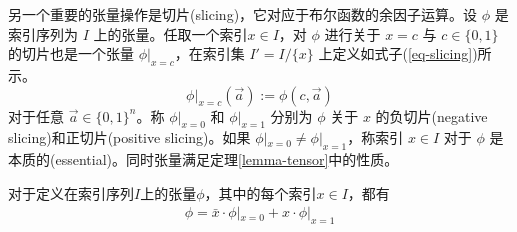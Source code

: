 另一个重要的张量操作是切片(slicing)，它对应于布尔函数的余因子运算。设 $\phi$ 是索引序列为 $I$ 上的张量。任取一个索引\(x\in I\)，对 $\phi$ 进行关于 $x = c$ 与 $c \in \{0, 1\}$ 的切片也是一个张量 $\phi|_{x=c}$，在索引集 $I' =I/\{x\}$ 上定义如式子(\ref{eq-slicing})所示。
\begin{equation}
    \label{eq-slicing}
\phi|_{x=c}(\overrightarrow{a}) := \phi(c, \overrightarrow{a})
\end{equation}
对于任意 $\overrightarrow{a} \in \{0, 1\}^n$。称 $\phi|_{x=0}$ 和 $\phi|_{x=1}$ 分别为 $\phi$ 关于 $x$ 的负切片(negative slicing)和正切片(positive slicing)。如果 $\phi|_{x=0} \neq \phi|_{x=1}$，称索引 $x \in I$ 对于 $\phi$ 是本质的(essential)。同时张量满足定理\ref{lemma-tensor}中的性质。

\begin{lemma}
    \label{lemma-tensor}
    对于定义在索引序列\(I\)上的张量\(\phi\)，其中的每个索引\(x\in I\)，都有
    \begin{align}
        \phi = \bar{x}\cdot \phi|_{x=0}+x\cdot \phi|_{x=1}
    \end{align}
\end{lemma}

